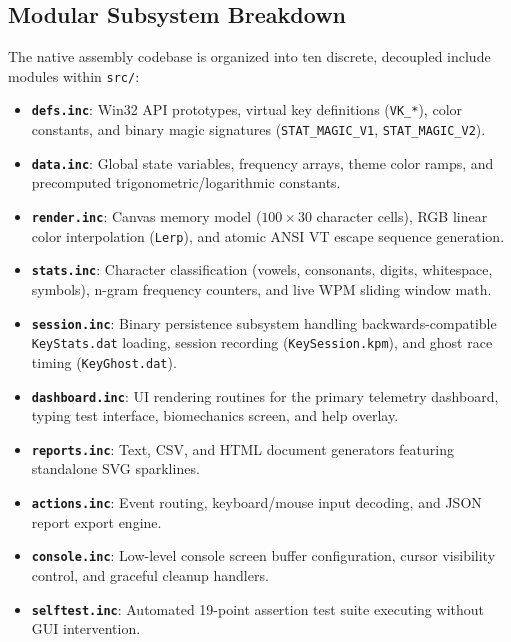 \documentclass[11pt,a4paper]{article}
\begin{document}
\subsection{Modular Subsystem Breakdown}
The native assembly codebase is organized into ten discrete, decoupled include modules within \texttt{src/}:
\begin{itemize}[leftmargin=*]
  \item \textbf{\texttt{defs.inc}}: Win32 API prototypes, virtual key definitions (\texttt{VK\_*}), color constants, and binary magic signatures (\texttt{STAT\_MAGIC\_V1}, \texttt{STAT\_MAGIC\_V2}).
  \item \textbf{\texttt{data.inc}}: Global state variables, frequency arrays, theme color ramps, and precomputed trigonometric/logarithmic constants.
  \item \textbf{\texttt{render.inc}}: Canvas memory model ($100 \times 30$ character cells), RGB linear color interpolation (\texttt{Lerp}), and atomic ANSI VT escape sequence generation.
  \item \textbf{\texttt{stats.inc}}: Character classification (vowels, consonants, digits, whitespace, symbols), n-gram frequency counters, and live WPM sliding window math.
  \item \textbf{\texttt{session.inc}}: Binary persistence subsystem handling backwards-compatible \texttt{KeyStats.dat} loading, session recording (\texttt{KeySession.kpm}), and ghost race timing (\texttt{KeyGhost.dat}).
  \item \textbf{\texttt{dashboard.inc}}: UI rendering routines for the primary telemetry dashboard, typing test interface, biomechanics screen, and help overlay.
  \item \textbf{\texttt{reports.inc}}: Text, CSV, and HTML document generators featuring standalone SVG sparklines.
  \item \textbf{\texttt{actions.inc}}: Event routing, keyboard/mouse input decoding, and JSON report export engine.
  \item \textbf{\texttt{console.inc}}: Low-level console screen buffer configuration, cursor visibility control, and graceful cleanup handlers.
  \item \textbf{\texttt{selftest.inc}}: Automated 19-point assertion test suite executing without GUI intervention.
\end{itemize}

\end{document}
